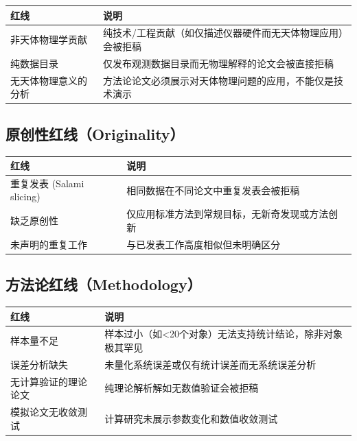 \documentclass[12pt,a4paper]{article}
\begin{document}
\begin{center}
\renewcommand{\arraystretch}{1.3}
\begin{tabular}{|p{4cm}|p{9cm}|}
\hline
\rowcolor{red!20}
\textbf{红线} & \textbf{说明} \\
\hline
非天体物理学贡献 & 纯技术/工程贡献（如仅描述仪器硬件而无天体物理应用）会被拒稿 \\
\hline
纯数据目录 & 仅发布观测数据目录而无物理解释的论文会被直接拒稿 \\
\hline
无天体物理意义的分析 & 方法论论文必须展示对天体物理问题的应用，不能仅是技术演示 \\
\hline
\end{tabular}
\end{center}

\subsection{原创性红线（Originality）}

\begin{center}
\renewcommand{\arraystretch}{1.3}
\begin{tabular}{|p{4cm}|p{9cm}|}
\hline
\rowcolor{red!20}
\textbf{红线} & \textbf{说明} \\
\hline
重复发表 (Salami slicing) & 相同数据在不同论文中重复发表会被拒稿 \\
\hline
缺乏原创性 & 仅应用标准方法到常规目标，无新奇发现或方法创新 \\
\hline
未声明的重复工作 & 与已发表工作高度相似但未明确区分 \\
\hline
\end{tabular}
\end{center}

\subsection{方法论红线（Methodology）}

\begin{center}
\renewcommand{\arraystretch}{1.3}
\begin{tabular}{|p{4cm}|p{9cm}|}
\hline
\rowcolor{red!20}
\textbf{红线} & \textbf{说明} \\
\hline
样本量不足 & 样本过小（如<20个对象）无法支持统计结论，除非对象极其罕见 \\
\hline
误差分析缺失 & 未量化系统误差或仅有统计误差而无系统误差分析 \\
\hline
无计算验证的理论论文 & 纯理论解析解如无数值验证会被拒稿 \\
\hline
模拟论文无收敛测试 & 计算研究未展示参数变化和数值收敛测试 \\
\hline
\end{tabular}
\end{center}
\end{document}
